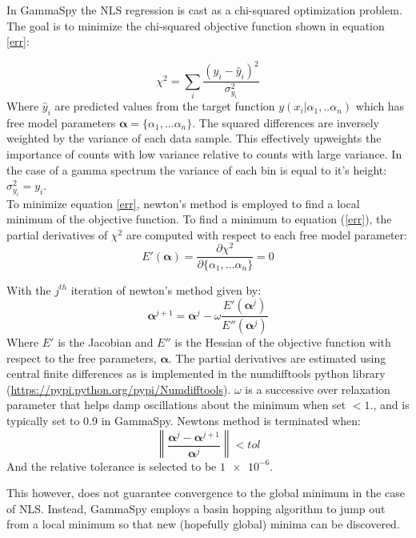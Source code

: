\documentclass[10pt]{article}
\begin{document}
In GammaSpy the NLS regression is cast as a chi-squared optimization problem.
The goal is to minimize the chi-squared objective function shown in equation \ref{err}:

\begin{equation}
    \chi^2 = \sum_i \frac{(y_i - \hat y_i)^2}{\sigma_{y_i}^2}
    \label{err}
\end{equation}
Where $\hat y_i$ are predicted values from the target function $y(x_i|\alpha_1,
.. \alpha_n)$ which has free model parameters $\bm{\alpha} = \{\alpha_1, ... \alpha_n\}$.
The squared differences are inversely weighted by the variance of each data
sample.  This effectively upweights the importance of counts with low variance
relative to counts with large variance.  In the case of a gamma spectrum the
variance of each bin is equal to it's height: $\sigma_{y_i}^2 = y_i$. \\

To minimize equation \ref{err}, newton's method is employed to find a local
minimum of the objective function.  To find a minimum to equation (\ref{err}), the partial derivatives of $\chi^2$ are
computed with respect to each free model parameter:
\begin{equation}
    E'(\bm \alpha) = \frac{\partial \chi^2}{\partial \{\alpha_1, ... \alpha_n\}} = 0
\end{equation}

With the $j^{th}$ iteration of newton's method given by:
\begin{equation}
    \bm \alpha^{j+1} = \bm \alpha^j -  \omega \frac{E'(\bm \alpha^j)}{ E''(\bm \alpha^j)}
\end{equation}
Where $E'$ is the Jacobian and $E''$ is the Hessian of the objective function with
respect to the free parameters, $\bm{\alpha}$.  The partial derivatives are estimated using
central finite differences as is implemented in the numdifftools python library (\url{https://pypi.python.org/pypi/Numdifftools}). $\omega$ is a successive over
relaxation parameter that helps damp oscillations about the minimum when set $<1.$, and is
typically set to 0.9 in GammaSpy.  Newtons method is terminated when:
\begin{equation}
    \left\lVert \frac{\bm \alpha^j - \bm \alpha^{j+1}}{\bm \alpha^j}\right\rVert < tol
\end{equation}
And the relative tolerance is selected to be $\SI{1e-6}$.

This however, does not guarantee convergence
to the global minimum in the case of NLS.  Instead, GammaSpy employs a basin
hopping algorithm to jump out from a local minimum so that new (hopefully
global) minima can be discovered. \\
\end{document}
